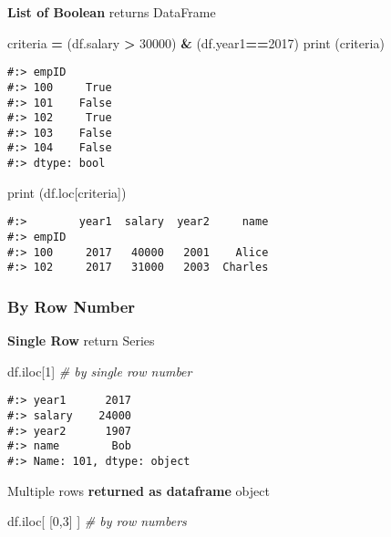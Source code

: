 \documentclass[
]{book}
\newenvironment{Shaded}{\begin{snugshade}}{\end{snugshade}}
\newcommand{\BuiltInTok}[1]{#1}
\newcommand{\CommentTok}[1]{\textcolor[rgb]{0.37,0.37,0.37}{\textit{#1}}}
\newcommand{\DecValTok}[1]{\textcolor[rgb]{0.06,0.06,0.06}{#1}}
\newcommand{\NormalTok}[1]{#1}
\newcommand{\OperatorTok}[1]{\textcolor[rgb]{0.43,0.43,0.43}{\textbf{#1}}}
\begin{document}
\textbf{List of Boolean} returns DataFrame

\begin{Shaded}
\begin{Highlighting}[]
\NormalTok{criteria }\OperatorTok{=}\NormalTok{ (df.salary }\OperatorTok{\textgreater{}} \DecValTok{30000}\NormalTok{) }\OperatorTok{\&}\NormalTok{ (df.year1}\OperatorTok{==}\DecValTok{2017}\NormalTok{)}
\BuiltInTok{print}\NormalTok{ (criteria)}
\end{Highlighting}
\end{Shaded}

\begin{verbatim}
#:> empID
#:> 100     True
#:> 101    False
#:> 102     True
#:> 103    False
#:> 104    False
#:> dtype: bool
\end{verbatim}

\begin{Shaded}
\begin{Highlighting}[]
\BuiltInTok{print}\NormalTok{ (df.loc[criteria])}
\end{Highlighting}
\end{Shaded}

\begin{verbatim}
#:>        year1  salary  year2     name
#:> empID                               
#:> 100     2017   40000   2001    Alice
#:> 102     2017   31000   2003  Charles
\end{verbatim}

\hypertarget{by-row-number}{%
\subsubsection{By Row Number}\label{by-row-number}}

\textbf{Single Row} return Series

\begin{Shaded}
\begin{Highlighting}[]
\NormalTok{df.iloc[}\DecValTok{1}\NormalTok{]  }\CommentTok{\# by single row number}
\end{Highlighting}
\end{Shaded}

\begin{verbatim}
#:> year1      2017
#:> salary    24000
#:> year2      1907
#:> name        Bob
#:> Name: 101, dtype: object
\end{verbatim}

Multiple rows \textbf{returned as dataframe} object

\begin{Shaded}
\begin{Highlighting}[]
\NormalTok{df.iloc[ [}\DecValTok{0}\NormalTok{,}\DecValTok{3}\NormalTok{] ]    }\CommentTok{\# by row numbers}
\end{Highlighting}
\end{Shaded}
\end{document}
